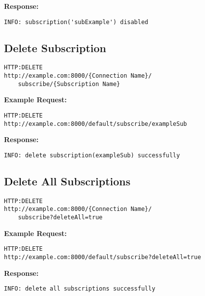 \textbf{Response:}
\begin{lstlisting}
INFO: subscription('subExample') disabled
\end{lstlisting}

\subsection{Delete Subscription}
\begin{lstlisting}
HTTP:DELETE
http://example.com:8000/{Connection Name}/
	subscribe/{Subscription Name}
\end{lstlisting}

\begin{minipage}{\linewidth}
\textbf{Example Request:}
\begin{lstlisting}
HTTP:DELETE
http://example.com:8000/default/subscribe/exampleSub
\end{lstlisting}
\end{minipage}

\begin{minipage}{\linewidth}
\textbf{Response:}
\begin{lstlisting}
INFO: delete subscription(exampleSub) successfully
\end{lstlisting}
\end{minipage}

\subsection{Delete All Subscriptions}
\begin{lstlisting}
HTTP:DELETE
http://example.com:8000/{Connection Name}/
	subscribe?deleteAll=true
\end{lstlisting}

\begin{minipage}{\linewidth}
\textbf{Example Request:}
\begin{lstlisting}
HTTP:DELETE
http://example.com:8000/default/subscribe?deleteAll=true
\end{lstlisting}
\end{minipage}

\begin{minipage}{\linewidth}
\textbf{Response:}
\begin{lstlisting}
INFO: delete all subscriptions successfully
\end{lstlisting}
\end{minipage}